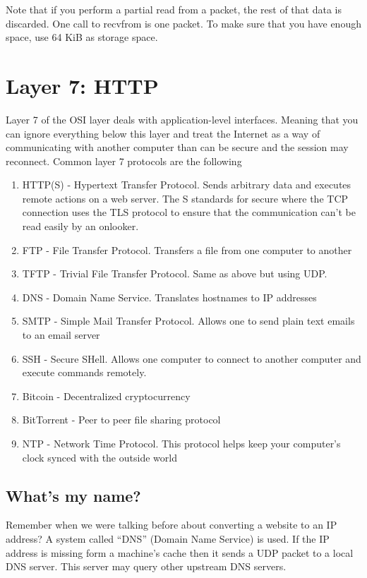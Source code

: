Note that if you perform a partial read from a packet, the rest of that data is discarded.
One call to recvfrom is one packet.
To make sure that you have enough space, use 64 KiB as storage space.

\section{Layer 7: HTTP}

Layer 7 of the OSI layer deals with application-level interfaces.
Meaning that you can ignore everything below this layer and treat the Internet as a way of communicating with another computer than can be secure and the session may reconnect.
Common layer 7 protocols are the following

\begin{enumerate}
  \item HTTP(S) - Hypertext Transfer Protocol.
    Sends arbitrary data and executes remote actions on a web server.
    The S standards for secure where the TCP connection uses the TLS protocol to ensure that the communication can't be read easily by an onlooker.
  \item FTP - File Transfer Protocol.
    Transfers a file from one computer to another
  \item TFTP - Trivial File Transfer Protocol.
    Same as above but using UDP.
  \item DNS - Domain Name Service.
    Translates hostnames to IP addresses
  \item SMTP - Simple Mail Transfer Protocol.
    Allows one to send plain text emails to an email server
  \item SSH - Secure SHell.
    Allows one computer to connect to another computer and execute commands remotely.
  \item Bitcoin - Decentralized cryptocurrency
  \item BitTorrent - Peer to peer file sharing protocol
  \item NTP - Network Time Protocol.
    This protocol helps keep your computer's clock synced with the outside world
\end{enumerate}

\subsection{What's my name?}

Remember when we were talking before about converting a website to an IP address?
A system called ``DNS'' (Domain Name Service) is used.
If the IP address is missing form a machine's cache then it sends a UDP packet to a local DNS server.
This server may query other upstream DNS servers.

